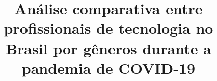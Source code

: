 \title{Análise comparativa entre profissionais de tecnologia no Brasil por gêneros durante a pandemia de COVID-19 \\
}